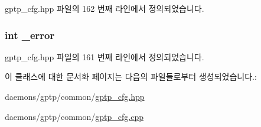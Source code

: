 gptp\+\_\+cfg.\+hpp 파일의 162 번째 라인에서 정의되었습니다.

\subsubsection[{\texorpdfstring{\+\_\+error}{_error}}]{\setlength{\rightskip}{0pt plus 5cm}int \+\_\+error\hspace{0.3cm}{\ttfamily [private]}}\hypertarget{class_gptp_ini_parser_ac8276d19a3649d089bb13cdc726cf3cc}{}\label{class_gptp_ini_parser_ac8276d19a3649d089bb13cdc726cf3cc}


gptp\+\_\+cfg.\+hpp 파일의 161 번째 라인에서 정의되었습니다.



이 클래스에 대한 문서화 페이지는 다음의 파일들로부터 생성되었습니다.\+:\begin{DoxyCompactItemize}
\item 
daemons/gptp/common/\hyperlink{gptp__cfg_8hpp}{gptp\+\_\+cfg.\+hpp}\item 
daemons/gptp/common/\hyperlink{gptp__cfg_8cpp}{gptp\+\_\+cfg.\+cpp}\end{DoxyCompactItemize}
